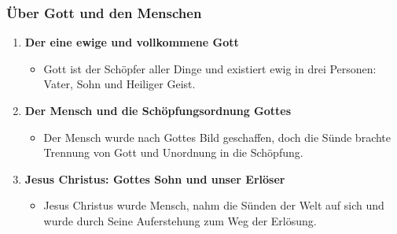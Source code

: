 \documentclass[aspectratio=43]{beamer}
\begin{document}
\begin{frame}
    \frametitle{Über Gott und den Menschen}  %
    \begin{enumerate}
        \item \textbf{Der eine ewige und vollkommene Gott}
            \begin{itemize}              
                \item Gott ist der Schöpfer aller Dinge und existiert ewig in drei Personen: Vater, Sohn und Heiliger Geist.
            \end{itemize}
            \vspace{0.25cm}
        \item \textbf{Der Mensch und die Schöpfungsordnung Gottes}
            \begin{itemize}
                \item Der Mensch wurde nach Gottes Bild geschaffen, doch die Sünde brachte Trennung von Gott und Unordnung in die Schöpfung.
            \end{itemize}
            \vspace{0.25cm}
        \item \textbf{Jesus Christus: Gottes Sohn und unser Erlöser}
            \begin{itemize}
                \item Jesus Christus wurde Mensch, nahm die Sünden der Welt auf sich und wurde durch Seine Auferstehung zum Weg der Erlösung.
            \end{itemize}              
    \end{enumerate}   
\end{frame}
\end{document}
